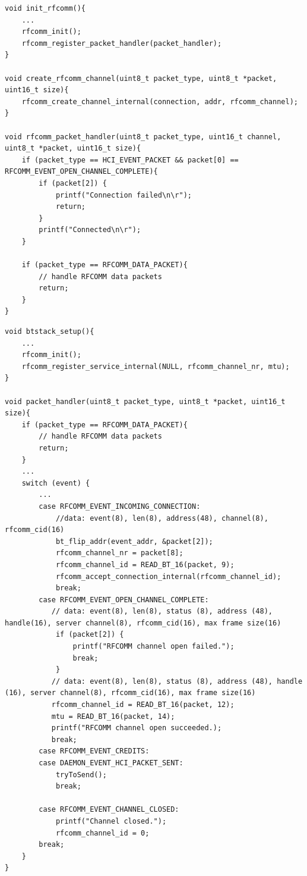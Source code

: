 \documentclass[a4paper,titlepage,oneside,12pt]{amsart} %
\begin{document}
\begin{lstlisting}[float, caption=RFCOMM handler for outgoing RFCOMM channel., label=RFCOMMremoteService] 
void init_rfcomm(){
    ...
    rfcomm_init();
    rfcomm_register_packet_handler(packet_handler);
}

void create_rfcomm_channel(uint8_t packet_type, uint8_t *packet, uint16_t size){
    rfcomm_create_channel_internal(connection, addr, rfcomm_channel);
}

void rfcomm_packet_handler(uint8_t packet_type, uint16_t channel, uint8_t *packet, uint16_t size){
    if (packet_type == HCI_EVENT_PACKET && packet[0] == RFCOMM_EVENT_OPEN_CHANNEL_COMPLETE){
        if (packet[2]) {
            printf("Connection failed\n\r");
            return;
        }
        printf("Connected\n\r");
    }
    
    if (packet_type == RFCOMM_DATA_PACKET){
        // handle RFCOMM data packets
        return;
    }
}
\end{lstlisting}

\begin{lstlisting}[float, caption=Providing RFCOMM service., label=RFCOMMService]
void btstack_setup(){
    ...
    rfcomm_init();
    rfcomm_register_service_internal(NULL, rfcomm_channel_nr, mtu); 
}

void packet_handler(uint8_t packet_type, uint8_t *packet, uint16_t size){
    if (packet_type == RFCOMM_DATA_PACKET){
        // handle RFCOMM data packets
        return;
    }
    ...
    switch (event) {
        ...
        case RFCOMM_EVENT_INCOMING_CONNECTION:
            //data: event(8), len(8), address(48), channel(8), rfcomm_cid(16)
            bt_flip_addr(event_addr, &packet[2]); 
            rfcomm_channel_nr = packet[8];
            rfcomm_channel_id = READ_BT_16(packet, 9);
            rfcomm_accept_connection_internal(rfcomm_channel_id);
            break;
        case RFCOMM_EVENT_OPEN_CHANNEL_COMPLETE:
           // data: event(8), len(8), status (8), address (48), handle(16), server channel(8), rfcomm_cid(16), max frame size(16)
            if (packet[2]) {
                printf("RFCOMM channel open failed.");
                break;
            } 
           // data: event(8), len(8), status (8), address (48), handle (16), server channel(8), rfcomm_cid(16), max frame size(16)
           rfcomm_channel_id = READ_BT_16(packet, 12);
           mtu = READ_BT_16(packet, 14);
           printf("RFCOMM channel open succeeded.);
           break;
        case RFCOMM_EVENT_CREDITS:
        case DAEMON_EVENT_HCI_PACKET_SENT:
            tryToSend();
            break;

        case RFCOMM_EVENT_CHANNEL_CLOSED:
            printf("Channel closed.");
            rfcomm_channel_id = 0;
        break;
    }
}
\end{lstlisting}
\end{document}
